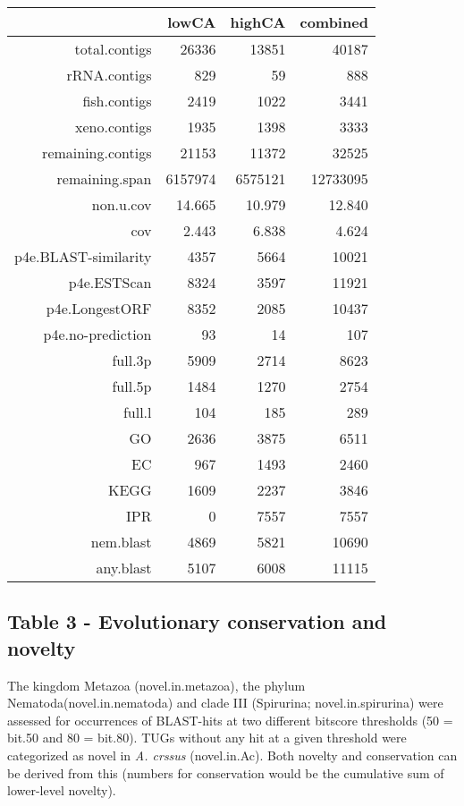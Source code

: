 \documentclass[10pt]{bmc_article}
\newenvironment{bmcformat}{\begin{raggedright}\baselineskip20pt\sloppy\setboolean{publ}{false}}{\end{raggedright}\baselineskip20pt\sloppy}
\begin{document}
\begin{bmcformat}
\begin{table}[ht]
\begin{center}
\begin{tabular}{rrrr}
  \hline
 & lowCA & highCA & combined \\ 
  \hline
total.contigs & 26336 & 13851 & 40187 \\ 
  rRNA.contigs & 829 & 59 & 888 \\ 
  fish.contigs & 2419 & 1022 & 3441 \\ 
  xeno.contigs & 1935 & 1398 & 3333 \\ 
  remaining.contigs & 21153 & 11372 & 32525 \\ 
  remaining.span & 6157974 & 6575121 & 12733095 \\ 
  non.u.cov & 14.665 & 10.979 & 12.840 \\ 
  cov & 2.443 & 6.838 & 4.624 \\ 
  p4e.BLAST-similarity & 4357 & 5664 & 10021 \\ 
  p4e.ESTScan & 8324 & 3597 & 11921 \\ 
  p4e.LongestORF & 8352 & 2085 & 10437 \\ 
  p4e.no-prediction & 93 & 14 & 107 \\ 
  full.3p & 5909 & 2714 & 8623 \\ 
  full.5p & 1484 & 1270 & 2754 \\ 
  full.l & 104 & 185 & 289 \\ 
  GO & 2636 & 3875 & 6511 \\ 
  EC & 967 & 1493 & 2460 \\ 
  KEGG & 1609 & 2237 & 3846 \\ 
  IPR & 0 & 7557 & 7557 \\ 
  nem.blast & 4869 & 5821 & 10690 \\ 
  any.blast & 5107 & 6008 & 11115 \\ 
   \hline
\end{tabular}
\end{center}
\end{table}
\subsection*{Table 3 - Evolutionary conservation and novelty}

The kingdom Metazoa (novel.in.metazoa), the phylum
Nematoda(novel.in.nematoda) and clade III (Spirurina;
novel.in.spirurina) were assessed for occurrences of BLAST-hits at two
different bitscore thresholds (50 = bit.50 and 80 = bit.80). TUGs
without any hit at a given threshold were categorized as novel in
\textit{A. crssus} (novel.in.Ac). Both novelty and conservation can be
derived from this (numbers for conservation would be the cumulative
sum of lower-level novelty).


\end{bmcformat}
\end{document}
